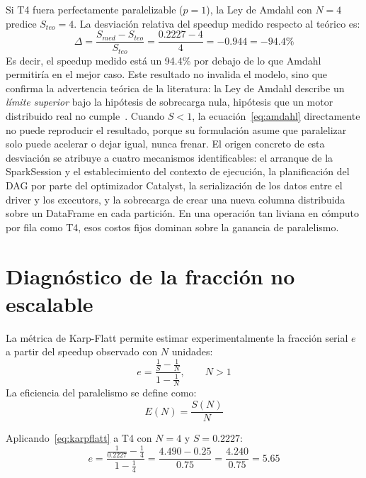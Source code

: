 \documentclass[11pt,a4paper]{article}
\begin{document}
Si T4 fuera perfectamente paralelizable ($p = 1$), la Ley de Amdahl con $N=4$ predice $S_{teo} = 4$. La desviación relativa del speedup medido respecto al teórico es:
\begin{equation*}
\Delta = \frac{S_{med} - S_{teo}}{S_{teo}} = \frac{0.2227 - 4}{4} = -0.944 = -94.4\%
\end{equation*}
Es decir, el speedup medido está un 94.4\% por debajo de lo que Amdahl permitiría en el mejor caso. Este resultado no invalida el modelo, sino que confirma la advertencia teórica de la literatura: la Ley de Amdahl describe un \emph{límite superior} bajo la hipótesis de sobrecarga nula, hipótesis que un motor distribuido real no cumple~\cite{lizardo2026}. Cuando $S<1$, la ecuación~\eqref{eq:amdahl} directamente no puede reproducir el resultado, porque su formulación asume que paralelizar solo puede acelerar o dejar igual, nunca frenar. El origen concreto de esta desviación se atribuye a cuatro mecanismos identificables: el arranque de la SparkSession y el establecimiento del contexto de ejecución, la planificación del DAG por parte del optimizador Catalyst, la serialización de los datos entre el driver y los executors, y la sobrecarga de crear una nueva columna distribuida sobre un DataFrame en cada partición. En una operación tan liviana en cómputo por fila como T4, esos costos fijos dominan sobre la ganancia de paralelismo.

\section{Diagnóstico de la fracción no escalable}
La métrica de Karp-Flatt permite estimar experimentalmente la fracción serial $e$ a partir del speedup observado con $N$ unidades:
\begin{equation}
e = \frac{\frac{1}{S} - \frac{1}{N}}{1 - \frac{1}{N}}, \qquad N > 1
\label{eq:karpflatt}
\end{equation}
La eficiencia del paralelismo se define como:
\begin{equation}
E(N) = \frac{S(N)}{N}
\label{eq:eficiencia}
\end{equation}

Aplicando~\eqref{eq:karpflatt} a T4 con $N=4$ y $S = 0.2227$:
\begin{equation*}
e = \frac{\frac{1}{0.2227} - \frac{1}{4}}{1 - \frac{1}{4}} = \frac{4.490 - 0.25}{0.75} = \frac{4.240}{0.75} = 5.65
\end{equation*}
\end{document}

